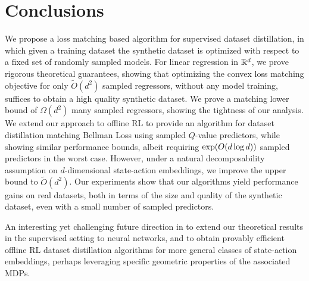 \section{Conclusions}
We propose a loss matching based algorithm for supervised dataset distillation, in which given a training dataset the synthetic dataset is optimized with respect to a fixed set of randomly sampled models. For linear regression in $\mathbb{R}^d$, we prove rigorous theoretical guarantees, showing that optimizing the convex loss matching objective for only $\tilde{O}(d^2)$ sampled regressors, without any model training, suffices to obtain a high quality synthetic dataset. We prove a matching lower bound of $\Omega(d^2)$ many sampled regressors, showing the tightness of our analysis. We extend our approach to offline RL to provide an algorithm for dataset distillation matching Bellman Loss using sampled $Q$-value predictors, while showing similar performance bounds, albeit requiring $\textnormal{exp}(O(d\log d))$ sampled predictors in the worst case. However, under a natural decomposability assumption on $d$-dimensional state-action embeddings, we improve the upper bound to $\tilde{O}(d^2)$. Our experiments show that our algorithms yield performance gains on real datasets, both in terms of the size and quality of the synthetic dataset, even with a small number of sampled predictors. 

An interesting yet challenging future direction in to extend our theoretical results in the supervised setting to neural networks, and to obtain provably efficient offline RL dataset distillation algorithms for more general classes of state-action embeddings, perhaps leveraging specific geometric properties of the associated MDPs.
